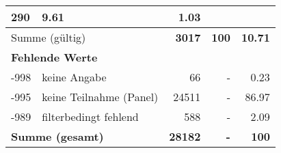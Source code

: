 \begin{longtable}{lXrrr}
       \num{290} &
       \num[round-mode=places,round-precision=2]{9.61} &
         \num[round-mode=places,round-precision=2]{1.03} \\
     \midrule
     \multicolumn{2}{l}{Summe (gültig)} &
       \textbf{\num{3017}} &
     \textbf{\num{100}} &
       \textbf{\num[round-mode=places,round-precision=2]{10.71}} \\
     \multicolumn{5}{l}{\textbf{Fehlende Werte}}\\
       -998 &
       keine Angabe &
         \num{66} &
        - &
         \num[round-mode=places,round-precision=2]{0.23} \\
       -995 &
       keine Teilnahme (Panel) &
         \num{24511} &
        - &
         \num[round-mode=places,round-precision=2]{86.97} \\
       -989 &
       filterbedingt fehlend &
         \num{588} &
        - &
         \num[round-mode=places,round-precision=2]{2.09} \\
     \midrule
     \multicolumn{2}{l}{\textbf{Summe (gesamt)}} &
          \textbf{\num{28182}} &
        \textbf{-} &
        \textbf{\num{100}} \\
     \bottomrule
     \end{longtable}
     
